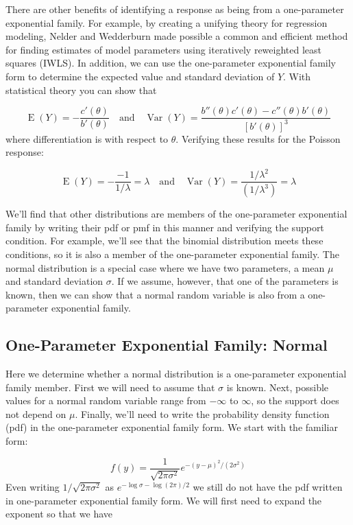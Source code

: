 \documentclass[
]{krantz}
\newcommand{\E}{\operatorname{E}}
\newcommand{\var}{\operatorname{Var}}
\begin{document}
There are other benefits of identifying a response as being from a one-parameter exponential family. For example, by creating a unifying theory for regression modeling, Nelder and Wedderburn made possible a common and efficient method for finding estimates of model parameters using iteratively reweighted least squares (IWLS). In addition, we can use the one-parameter exponential family form to determine the expected value and standard deviation of \(Y\). With statistical theory you can show that

\[\E(Y) =-\frac{c'(\theta)}{b'(\theta)} \quad \textrm{and} \quad \var(Y) =\frac{b''(\theta)c'(\theta)-c''(\theta)b'(\theta)}{[b'(\theta)]^3}
\]
where differentiation is with respect to \(\theta\). Verifying these results for the Poisson response:

\[\E(Y)=-\frac{-1}{1/\lambda}=\lambda \quad \textrm{and} \quad  \var(Y)=\frac{1/{{\lambda}^2}}
{(1/{\lambda}^3)}=\lambda
\]

We'll find that other distributions are members of the one-parameter exponential family by writing their pdf or pmf in this manner and verifying the support condition. For example, we'll see that the binomial distribution meets these conditions, so it is also a member of the one-parameter exponential family. The normal distribution is a special case where we have two parameters, a mean \(\mu\) and standard deviation \(\sigma\). If we assume, however, that one of the parameters is known, then we can show that a normal random variable is also from a one-parameter exponential family.

\hypertarget{one-parameter-exponential-family-normal}{%
\subsection{One-Parameter Exponential Family: Normal}\label{one-parameter-exponential-family-normal}}

Here we determine whether a normal distribution is a one-parameter exponential family member. First we will need to assume that \(\sigma\) is known. Next, possible values for a normal random variable range from \(-\infty\) to \(\infty\), so the support does not depend on \(\mu\). Finally, we'll need to write the probability density function (pdf) in the one-parameter exponential family form. We start with the familiar form:

\[
f(y)=\frac{1}{{\sqrt{2\pi\sigma^2}}}{e^{-{(y-\mu)^2}/{(2\sigma^2)}}}
\]
Even writing \({1/{\sqrt{2\pi\sigma^2}}}\) as \(e^{-\log{\sigma}-\log(2\pi)/2}\) we still do not have the pdf written in one-parameter exponential family form. We will first need to expand the exponent so that we have
\end{document}
